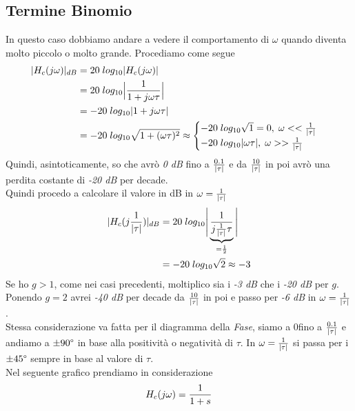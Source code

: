 \documentclass{article}
\begin{document}
		\subsection{Termine Binomio}
			In questo caso dobbiamo andare a vedere il comportamento di $ \omega $ quando diventa molto piccolo o molto grande. Procediamo come segue
			\[
				\begin{aligned}
					\vert H_c(j\omega) \vert_{dB} &= 20\; log_{10}\vert H_c(j\omega) \vert \\
					&= 20\; log_{10}\Big\vert {1\over{1 + j\omega\tau}} \Big\vert \\
					&= -20\; log_{10}\vert 1 + j\omega\tau \vert \\
					&= -20\; log_{10}\sqrt{1 + (\omega\tau)^2} \approx \begin{cases}
						-20\; log_{10}\sqrt{1} = 0,\; \omega << {1\over{\vert\tau\vert}} \\
						-20\; log_{10}\vert \omega\tau \vert,\; \omega >> {1\over{\vert\tau\vert}}
					\end{cases}
				\end{aligned}
			\]
			Quindi, asintoticamente, so che avrò \textit{0 dB} fino a $ {0.1\over{\vert\tau\vert}} $ e da $ {10\over{\vert\tau\vert}} $ in poi avrò una perdita costante di \textit{-20 dB} per decade. \\
			Quindi procedo a calcolare il valore in dB in $ \omega = {1\over{\vert\tau\vert}} $
			\[
				\begin{aligned}
					\vert H_c(j{1\over{\vert\tau\vert}}) \vert_{dB} &= 20\; log_{10}\Bigg\vert \underbrace{{1\over{j{1\over{\vert\tau\vert}}\tau}}}_{={1\over{2}}} \Bigg\vert \\
					&= -20\; log_{10}\sqrt{2} \approx -3
				\end{aligned}
			\]
			Se ho $ g>1 $, come nei casi precedenti, moltiplico sia i \textit{-3 dB} che i \textit{-20 dB} per $ g $. Ponendo $ g=2 $ avrei \textit{-40 dB} per decade da $ {10\over{\vert\tau\vert}} $ in poi e passo per \textit{-6 dB} in $ \omega = {1\over{\vert\tau\vert}} $. \\
			Stessa considerazione va fatta per il diagramma della \textit{Fase}, siamo a 0\textdegree fino a $ {0.1\over{\vert\tau\vert}} $ e andiamo a $ \pm90\degree $ in base alla positività o negatività di $ \tau $. In $ \omega = {1\over{\vert\tau\vert}} $ si passa per i $ \pm45\degree $ sempre in base al valore di $ \tau $.
			\\
			Nel seguente grafico prendiamo in considerazione
			\[
				H_c(j\omega) = {1\over{1 + s}}
			\]
\end{document}

